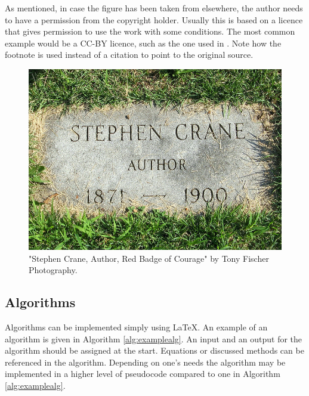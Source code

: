 As mentioned, in case the figure has been taken from elsewhere, the author needs to have a permission from the copyright holder. Usually this is based on a licence that gives permission to use the work with some conditions. The most common example would be a CC-BY licence, such as the one used in . Note how the footnote is used instead of a citation to point to the original source. 

\begin{figure}[H]
  \begin{center}
    \includegraphics[width=12cm]{Figures/ccby.jpg}
  \end{center}
    \caption[]{"Stephen Crane, Author, Red Badge of Courage" by Tony Fischer Photography\footnotemark.}
    \label{fig:ccbypic}
\end{figure}

\subsection{Algorithms}
Algorithms can be implemented simply using \LaTeX. An example of an algorithm is given in Algorithm \ref{alg:examplealg}. An input and an output for the algorithm should be assigned at the start. Equations or discussed methods can be referenced in the algorithm. Depending on one's needs the algorithm may be implemented in a higher level of pseudocode compared to one in Algorithm \ref{alg:examplealg}.

